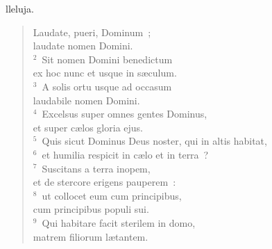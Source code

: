 \bchapter
{}lleluja. \begin{flushleft}\begin{verse}\vspace{6pt}Laudate, pueri, Dominum~;\\ laudate nomen Domini.\\
${}^{2}$~Sit nomen Domini benedictum\\ ex hoc nunc et usque in s\ae culum.\\
${}^{3}$~A solis ortu usque ad occasum\\ laudabile nomen Domini.\\
${}^{4}$~Excelsus super omnes gentes Dominus,\\ et super c\ae los gloria ejus.\\
${}^{5}$~Quis sicut Dominus Deus noster, qui in altis habitat,\\
${}^{6}$~et humilia respicit in c\ae lo et in terra~?\\
${}^{7}$~Suscitans a terra inopem,\\ et de stercore erigens pauperem~:\\
${}^{8}$~ut collocet eum cum principibus,\\ cum principibus populi sui.\\
${}^{9}$~Qui habitare facit sterilem in domo,\\ matrem filiorum l\ae tantem.\end{verse}\end{flushleft}



